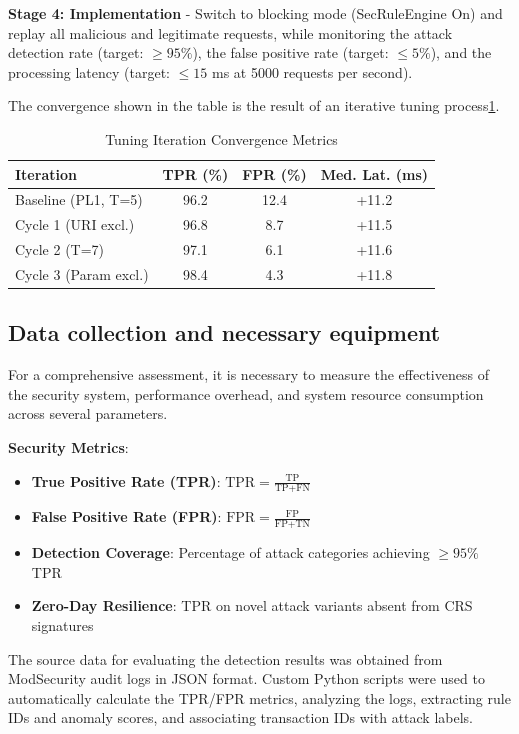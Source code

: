\documentclass[10pt,conference]{IEEEtran}
\begin{document}
\textbf{Stage 4: Implementation} - Switch to blocking mode (SecRuleEngine On) and replay all malicious and legitimate requests, while monitoring the attack detection rate (target: $\geq 95\%$), the false positive rate (target: $\leq 5\%$), and the processing latency (target: $\leq 15$ ms at 5000 requests per second).

The convergence shown in the table is the result of an iterative tuning process\ref{tab:tuning}.

\begin{table}[!h]
\centering
\caption{Tuning Iteration Convergence Metrics}
\label{tab:tuning}
\small
\begin{tabular}{|p{2.2cm}|c|c|c|}
\hline
\textbf{Iteration} & \textbf{TPR (\%)} & \textbf{FPR (\%)} & \textbf{Med. Lat. (ms)} \\
\hline
Baseline (PL1, T=5) & 96.2 & 12.4 & +11.2 \\
Cycle 1 (URI excl.) & 96.8 & 8.7 & +11.5 \\
Cycle 2 (T=7) & 97.1 & 6.1 & +11.6 \\
Cycle 3 (Param excl.) & 98.4 & 4.3 & +11.8 \\
\hline
\end{tabular}
\end{table}

\subsection{Data collection and necessary equipment}

For a comprehensive assessment, it is necessary to measure the effectiveness of the security system, performance overhead, and system resource consumption across several parameters.

\textbf{Security Metrics}:
\begin{itemize}
\item \textbf{True Positive Rate (TPR)}: $\text{TPR} = \frac{\text{TP}}{\text{TP} + \text{FN}}$
\item \textbf{False Positive Rate (FPR)}: $\text{FPR} = \frac{\text{FP}}{\text{FP} + \text{TN}}$
\item \textbf{Detection Coverage}: Percentage of attack categories achieving $\geq 95\%$ TPR
\item \textbf{Zero-Day Resilience}: TPR on novel attack variants absent from CRS signatures
\end{itemize}

The source data for evaluating the detection results was obtained from ModSecurity audit logs in JSON format. Custom Python scripts were used to automatically calculate the TPR/FPR metrics, analyzing the logs, extracting rule IDs and anomaly scores, and associating transaction IDs with attack labels.
\end{document}
